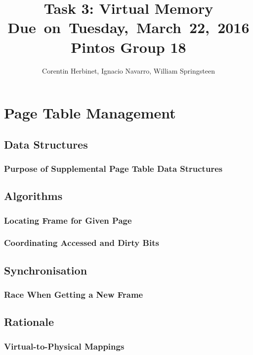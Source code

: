 \documentclass{article}
\title{
\vspace{2in}
\textmd{\textbf{Task 3: Virtual Memory}}\\
\normalsize\vspace{0.1in}\small{Due\ on\ Tuesday,\ March\ 22,\ 2016}\\
\vspace{0.1in}\large{\textbf{Pintos Group 18}}
\vspace{3in}
}
\author{Corentin Herbinet, Ignacio Navarro, William Springsteen}
\date{}
\renewcommand{\_}{\char`_}
\begin{document}
\maketitle
\newpage

\section{Page Table Management}

\subsection{Data Structures}

\subsubsection{Purpose of Supplemental Page Table Data Structures}

\subsection{Algorithms}

\subsubsection{Locating Frame for Given Page}

\subsubsection{Coordinating Accessed and Dirty Bits}

\subsection{Synchronisation}

\subsubsection{Race When Getting a New Frame}

\subsection{Rationale}

\subsubsection{Virtual-to-Physical Mappings}
\end{document}
